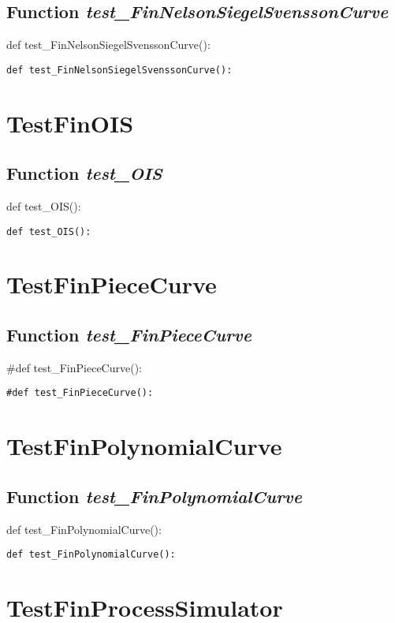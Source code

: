 \documentclass[twoside,11pt]{book}
\begin{document}
\subsection{Function {\it test\_FinNelsonSiegelSvenssonCurve}}
def test\_FinNelsonSiegelSvenssonCurve():

\begin{lstlisting}
def test_FinNelsonSiegelSvenssonCurve():
\end{lstlisting}


\newpage
\section{TestFinOIS}

\subsection{Function {\it test\_OIS}}
def test\_OIS(): 

\begin{lstlisting}
def test_OIS(): 
\end{lstlisting}


\newpage
\section{TestFinPieceCurve}

\subsection{Function {\it test\_FinPieceCurve}}
\#def test\_FinPieceCurve():

\begin{lstlisting}
#def test_FinPieceCurve():
\end{lstlisting}


\newpage
\section{TestFinPolynomialCurve}

\subsection{Function {\it test\_FinPolynomialCurve}}
def test\_FinPolynomialCurve(): 

\begin{lstlisting}
def test_FinPolynomialCurve(): 
\end{lstlisting}


\newpage
\section{TestFinProcessSimulator}
\end{document}
